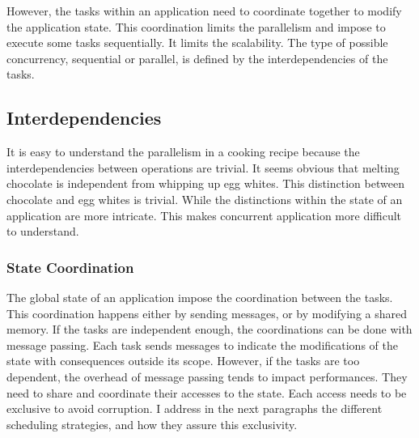 However, the tasks within an application need to coordinate together to modify the application state.
This coordination limits the parallelism and impose to execute some tasks sequentially.
It limits the scalability.
The type of possible concurrency, sequential or parallel, is defined by the interdependencies of the tasks.


\subsection{Interdependencies}

It is easy to understand the parallelism in a cooking recipe because the interdependencies between operations are trivial.
It seems obvious that melting chocolate is independent from whipping up egg whites.
This distinction between chocolate and egg whites is trivial.
While the distinctions within the state of an application are more intricate.
This makes concurrent application more difficult to understand.

\subsubsection{State Coordination}

The global state of an application impose the coordination between the tasks.
This coordination happens either by sending messages, or by modifying a shared memory.
If the tasks are independent enough, the coordinations can be done with message passing.
Each task sends messages to indicate the modifications of the state with consequences outside its scope.
However, if the tasks are too dependent, the overhead of message passing tends to impact performances.
They need to share and coordinate their accesses to the state.
Each access needs to be exclusive to avoid corruption.
I address in the next paragraphs the different scheduling strategies, and how they assure this exclusivity.


